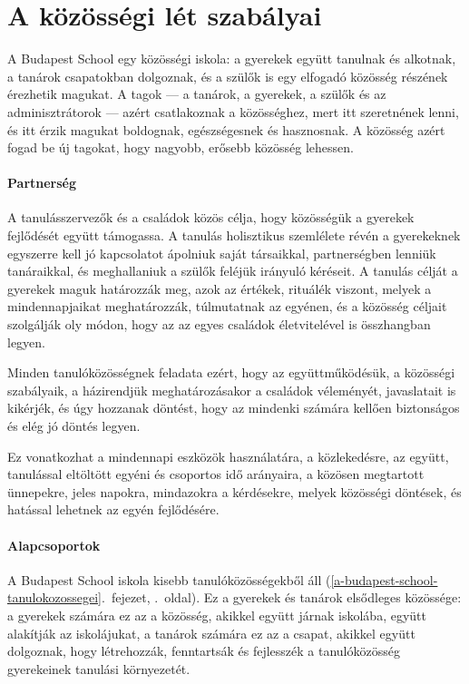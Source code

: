 \hypertarget{a-kozossegi-let-szabalyai}{%
\section{A közösségi lét szabályai}\label{a-kozossegi-let-szabalyai}}

A Budapest School egy közösségi iskola: a gyerekek együtt tanulnak és
alkotnak, a tanárok csapatokban dolgoznak, és a szülők is egy elfogadó
közösség részének érezhetik magukat. A tagok --- a tanárok, a gyerekek,
a szülők és az adminisztrátorok --- azért csatlakoznak a közösséghez,
mert itt szeretnének lenni, és itt érzik magukat boldognak,
egészségesnek és hasznosnak. A közösség azért fogad be új tagokat, hogy
nagyobb, erősebb közösség lehessen.

\hypertarget{partnerseg}{%
\paragraph{Partnerség}\label{partnerseg}}

A tanulásszervezők és a családok közös célja, hogy közösségük a gyerekek
fejlődését együtt támogassa. A tanulás holisztikus szemlélete révén a
gyerekeknek egyszerre kell jó kapcsolatot ápolniuk saját társaikkal,
partnerségben lenniük tanáraikkal, és meghallaniuk a szülők feléjük irányuló
kéréseit. A tanulás célját a gyerekek maguk határozzák meg, azok az
értékek, rituálék viszont, melyek a mindennapjaikat meghatározzák,
túlmutatnak az egyénen, és a közösség céljait szolgálják oly módon, hogy
az az egyes családok életvitelével is összhangban legyen.

Minden tanulóközösségnek feladata ezért, hogy az együttműködésük, a
közösségi szabályaik, a házirendjük meghatározásakor a családok
véleményét, javaslatait is kikérjék, és úgy hozzanak döntést, hogy az
mindenki számára kellően biztonságos és elég jó döntés legyen.

Ez vonatkozhat a mindennapi eszközök használatára, a közlekedésre, az
együtt, tanulással eltöltött egyéni és csoportos idő arányaira, a
közösen megtartott ünnepekre, jeles napokra, mindazokra a kérdésekre,
melyek közösségi döntések, és hatással lehetnek az egyén fejlődésére.

\hypertarget{alapcsoportok}{%
\paragraph{Alapcsoportok}\label{alapcsoportok}}

A Budapest School iskola kisebb
tanulóközösségekből áll (\ref{a-budapest-school-tanulokozossegei}.~fejezet, \pageref{a-budapest-school-tanulokozossegei}.~oldal). Ez a gyerekek és tanárok elsődleges közössége:
a gyerekek számára ez az a közösség, akikkel együtt járnak iskolába, együtt
alakítják az iskolájukat, a tanárok számára ez az a csapat, akikkel együtt
dolgoznak, hogy létrehozzák, fenntartsák és fejlesszék a tanulóközösség
gyerekeinek tanulási környezetét.

